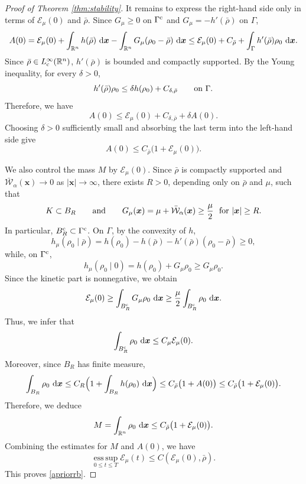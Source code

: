 \documentclass[reqno,11pt]{amsart}
\numberwithin{equation}{section}
\theoremstyle{definition}
\def\dd{{\, \rm d}}
\begin{document}
\begin{proof}[Proof of {\rm Theorem \ref{thm:stability}}]
It remains to express the right-hand side only in terms of
$\mathcal E_\mu(0)$ and $\bar\rho$.  Since
$G_\mu\ge0$ on $\Gamma^{\rm c}$ and $G_\mu=-h'(\bar\rho)$ on $\Gamma$,
\[
\begin{aligned}
 A(0)=\mathcal E_\mu(0)
   +\int_{\mathbb R^n}h(\bar\rho)\,\dd\boldsymbol{x}
   -\int_{\mathbb R^n}G_\mu(\rho_0-\bar\rho)\,\dd\boldsymbol{x}\le
 \mathcal E_\mu(0)+C_{\bar\rho}
 +\int_{\Gamma}h'(\bar\rho)\rho_0\,\dd\boldsymbol{x}.
\end{aligned}
\]
Since $\bar\rho\in L^\infty_{\rm c}(\mathbb R^n)$, $h'(\bar\rho)$ is bounded
and compactly supported.  By the Young inequality, for every $\delta>0$,
\[
 h'(\bar\rho)\rho_0
 \le \delta h(\rho_0)+C_{\delta,\bar\rho}
 \qquad\hbox{on }\Gamma .
\]
Therefore, we have
\[
 A(0)\le \mathcal E_\mu(0)+C_{\delta,\bar\rho}+\delta A(0).
\]
Choosing $\delta>0$ sufficiently small and absorbing the last term into the
left-hand side give
\[
 A(0)\le C_{\bar\rho}\bigl(1+\mathcal E_\mu(0)\bigr).
\]

We also control the mass $M$ by $\mathcal E_\mu(0)$.  Since
$\bar\rho$ is compactly supported and
$\bar{\mathcal W}_\alpha(\boldsymbol{x})\to0$ as
$|\boldsymbol{x}|\to\infty$, there exists $R>0$, depending only on
$\bar\rho$ and $\mu$, such that
\[
 K\subset B_R
 \qquad\hbox{and}\qquad
 G_\mu(\boldsymbol{x})
 =\mu+\bar{\mathcal W}_\alpha(\boldsymbol{x})
 \ge \frac{\mu}{2}
 \,\,\,\,\hbox{for }|\boldsymbol{x}|\ge R .
\]
In particular, $B_R^{\rm c}\subset\Gamma^{\rm c}$.  
On $\Gamma$, by the convexity of
$h$,
\[
 h_\mu(\rho_0\mid\bar\rho)
 =h(\rho_0)-h(\bar\rho)-h'(\bar\rho)(\rho_0-\bar\rho)\ge0,
\]
while, on $\Gamma^{\rm c}$,
\[
 h_\mu(\rho_0\mid0)=h(\rho_0)+G_\mu\rho_0\ge G_\mu\rho_0 .
\]
Since the kinetic part is nonnegative, we obtain
\[
 \mathcal E_\mu(0)
 \ge
 \int_{B_R^{\rm c}}G_\mu\rho_0\,\dd\boldsymbol{x}
 \ge
 \frac{\mu}{2}\int_{B_R^{\rm c}}\rho_0\,\dd\boldsymbol{x}.
\]
Thus, we infer that
\[
 \int_{B_R^{\rm c}}\rho_0\,\dd\boldsymbol{x}
 \le C_\mu\mathcal E_\mu(0).
\]
Moreover, since $B_R$ has finite measure,
\[
 \int_{B_R}\rho_0\,\dd\boldsymbol{x}
 \le C_R\Big(1+\int_{B_R}h(\rho_0)\,\dd\boldsymbol{x}\Big)
 \le C_{\bar\rho}\bigl(1+A(0)\bigr)
 \le C_{\bar\rho}\bigl(1+\mathcal E_\mu(0)\bigr).
\]
Therefore, we deduce
\[
 M=\int_{\mathbb R^n}\rho_0\,\dd\boldsymbol{x}
 \le C_{\bar\rho}\bigl(1+\mathcal E_\mu(0)\bigr).
\]
Combining the estimates for $M$ and $A(0)$,  we have
\[
 \operatorname*{ess\,sup}_{0\le t\le T}\mathcal E_\mu(t)
 \le C(\mathcal E_\mu(0),\bar\rho).
\]
This proves \eqref{apriorrb}.



\end{proof}
\end{document}
